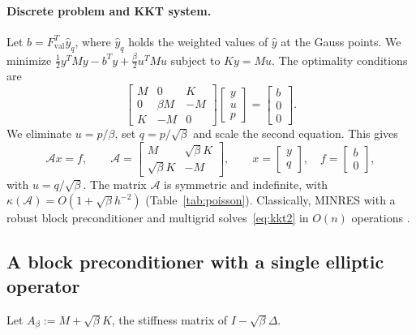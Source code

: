 \documentclass[11pt,a4paper]{article}
\newcommand{\A}{\mathcal{A}}
\theoremstyle{remark}
\begin{document}
\paragraph{Discrete problem and KKT system.} Let $b=F_{\mathrm{val}}^T\hat y_q$, where
$\hat y_q$ holds the weighted values of $\hat y$ at the Gauss points. We minimize
$\frac12y^TMy-b^Ty+\frac\beta2u^TMu$ subject to $Ky=Mu$. The optimality
conditions are
\begin{equation}\label{eq:kkt3}
\begin{bmatrix} M & 0 & K\\ 0 & \beta M & -M\\ K & -M & 0\end{bmatrix}
\begin{bmatrix} y\\ u\\ p\end{bmatrix}=\begin{bmatrix} b\\ 0\\ 0\end{bmatrix}.
\end{equation}
We eliminate $u=p/\beta$, set $q=p/\sqrt\beta$ and scale the second equation.
This gives
\begin{equation}\label{eq:kkt2}
\A x=f,\qquad
\A=\begin{bmatrix} M & \sqrt\beta K\\ \sqrt\beta K & -M\end{bmatrix},\qquad
x=\begin{bmatrix} y\\ q\end{bmatrix},\quad f=\begin{bmatrix} b\\ 0\end{bmatrix},
\end{equation}
with $u=q/\sqrt\beta$. The matrix $\A$ is symmetric and indefinite, with
$\kappa(\A)=O(1+\sqrt\beta h^{-2})$ (Table~\ref{tab:poisson}). Classically, MINRES
with a robust block preconditioner and multigrid solves~\eqref{eq:kkt2} in
$O(n)$ operations \cite{RDW10,SZ07,PW12}.

\subsection{A block preconditioner with a single elliptic operator}

Let $A_\beta:=M+\sqrt\beta K$, the stiffness matrix of $I-\sqrt\beta\Delta$.
\end{document}
